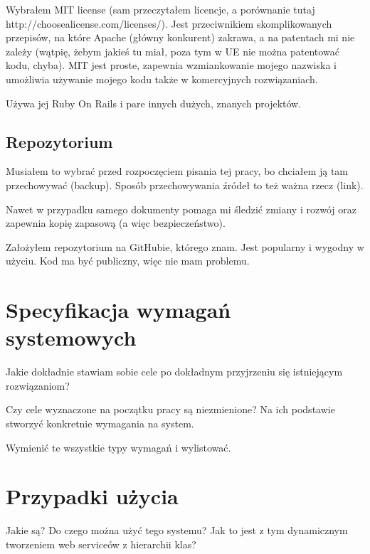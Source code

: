 Wybrałem MIT license (sam przeczytałem licencje, a porównanie tutaj http://choosealicense.com/licenses/). Jest przeciwnikiem skomplikowanych przepisów, na które Apache (główny konkurent) zakrawa, a na patentach mi nie zależy (wątpię, żebym jakieś tu miał, poza tym w UE nie można patentować kodu, chyba). MIT jest proste, zapewnia wzmiankowanie mojego nazwiska i umożliwia używanie mojego kodu także w komercyjnych rozwiązaniach.

Używa jej Ruby On Rails i pare innych dużych, znanych projektów.

\subsection{Repozytorium}
Musiałem to wybrać przed rozpoczęciem pisania tej pracy, bo chciałem ją tam przechowywać (backup). Sposób przechowywania źródeł to też ważna rzecz (link).

Nawet w przypadku samego dokumenty pomaga mi śledzić zmiany i rozwój oraz zapewnia kopię zapasową (a więc bezpieczeństwo).

Założyłem repozytorium na GitHubie, którego znam. Jest popularny i wygodny w użyciu. Kod ma być publiczny, więc nie mam problemu. 



\section{Specyfikacja wymagań systemowych}
Jakie dokładnie stawiam sobie cele po dokładnym przyjrzeniu się istniejącym rozwiązaniom?

Czy cele wyznaczone na początku pracy są niezmienione? Na ich podstawie stworzyć konkretnie wymagania na system.

Wymienić te wszystkie typy wymagań i wylistować.




\section{Przypadki użycia}
Jakie są? Do czego można użyć tego systemu? Jak to jest z tym dynamicznym tworzeniem web serviceów z hierarchii klas?



